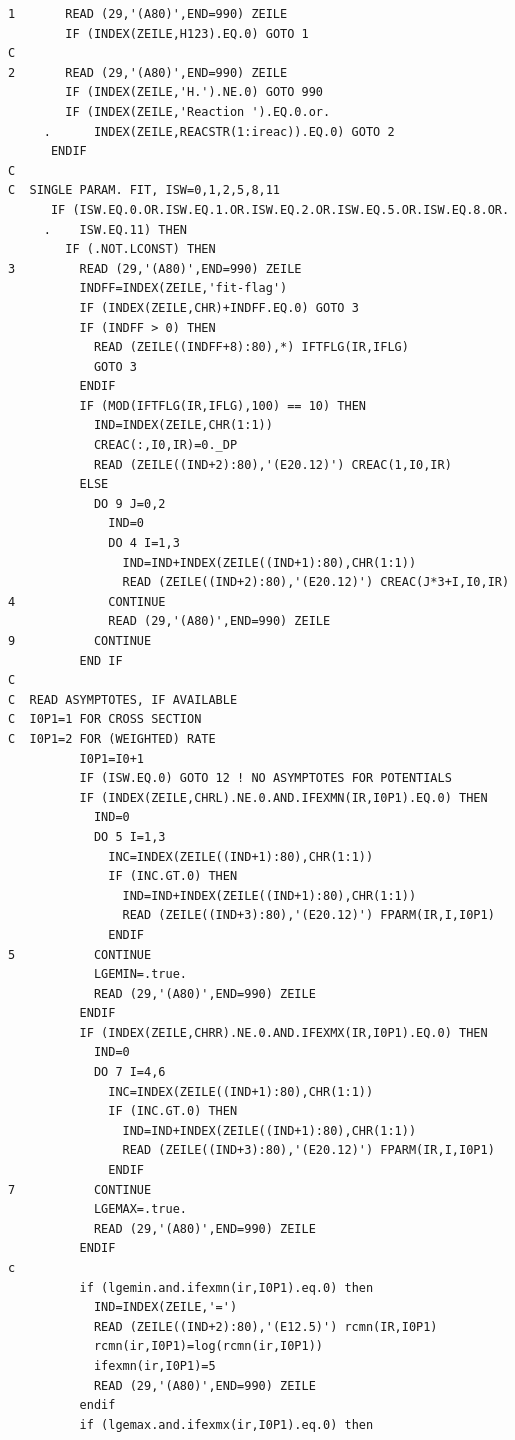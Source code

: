 \documentclass[12pt,dvips]{article}
\begin{document}
\begin{small}
\begin{verbatim}
1       READ (29,'(A80)',END=990) ZEILE
        IF (INDEX(ZEILE,H123).EQ.0) GOTO 1
C
2       READ (29,'(A80)',END=990) ZEILE
        IF (INDEX(ZEILE,'H.').NE.0) GOTO 990
        IF (INDEX(ZEILE,'Reaction ').EQ.0.or.
     .      INDEX(ZEILE,REACSTR(1:ireac)).EQ.0) GOTO 2
      ENDIF
C
C  SINGLE PARAM. FIT, ISW=0,1,2,5,8,11
      IF (ISW.EQ.0.OR.ISW.EQ.1.OR.ISW.EQ.2.OR.ISW.EQ.5.OR.ISW.EQ.8.OR.
     .    ISW.EQ.11) THEN
        IF (.NOT.LCONST) THEN
3         READ (29,'(A80)',END=990) ZEILE
          INDFF=INDEX(ZEILE,'fit-flag')
          IF (INDEX(ZEILE,CHR)+INDFF.EQ.0) GOTO 3
          IF (INDFF > 0) THEN
            READ (ZEILE((INDFF+8):80),*) IFTFLG(IR,IFLG)
            GOTO 3
          ENDIF
          IF (MOD(IFTFLG(IR,IFLG),100) == 10) THEN
            IND=INDEX(ZEILE,CHR(1:1))
            CREAC(:,I0,IR)=0._DP
            READ (ZEILE((IND+2):80),'(E20.12)') CREAC(1,I0,IR)
          ELSE
            DO 9 J=0,2
              IND=0
              DO 4 I=1,3
                IND=IND+INDEX(ZEILE((IND+1):80),CHR(1:1))
                READ (ZEILE((IND+2):80),'(E20.12)') CREAC(J*3+I,I0,IR)
4             CONTINUE
              READ (29,'(A80)',END=990) ZEILE
9           CONTINUE
          END IF
C
C  READ ASYMPTOTES, IF AVAILABLE
C  I0P1=1 FOR CROSS SECTION
C  I0P1=2 FOR (WEIGHTED) RATE
          I0P1=I0+1
          IF (ISW.EQ.0) GOTO 12 ! NO ASYMPTOTES FOR POTENTIALS
          IF (INDEX(ZEILE,CHRL).NE.0.AND.IFEXMN(IR,I0P1).EQ.0) THEN
            IND=0
            DO 5 I=1,3
              INC=INDEX(ZEILE((IND+1):80),CHR(1:1))
              IF (INC.GT.0) THEN
                IND=IND+INDEX(ZEILE((IND+1):80),CHR(1:1))
                READ (ZEILE((IND+3):80),'(E20.12)') FPARM(IR,I,I0P1)
              ENDIF
5           CONTINUE
            LGEMIN=.true.
            READ (29,'(A80)',END=990) ZEILE
          ENDIF
          IF (INDEX(ZEILE,CHRR).NE.0.AND.IFEXMX(IR,I0P1).EQ.0) THEN
            IND=0
            DO 7 I=4,6
              INC=INDEX(ZEILE((IND+1):80),CHR(1:1))
              IF (INC.GT.0) THEN
                IND=IND+INDEX(ZEILE((IND+1):80),CHR(1:1))
                READ (ZEILE((IND+3):80),'(E20.12)') FPARM(IR,I,I0P1)
              ENDIF
7           CONTINUE
            LGEMAX=.true.
            READ (29,'(A80)',END=990) ZEILE
          ENDIF
c
          if (lgemin.and.ifexmn(ir,I0P1).eq.0) then
            IND=INDEX(ZEILE,'=')
            READ (ZEILE((IND+2):80),'(E12.5)') rcmn(IR,I0P1)
            rcmn(ir,I0P1)=log(rcmn(ir,I0P1))
            ifexmn(ir,I0P1)=5
            READ (29,'(A80)',END=990) ZEILE
          endif
          if (lgemax.and.ifexmx(ir,I0P1).eq.0) then

\end{verbatim}
\end{small}
\end{document}
